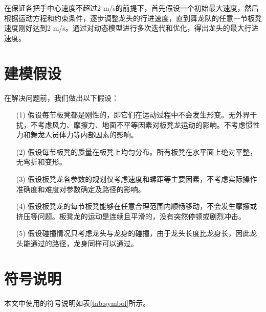 \documentclass[withoutpreface, bwprint]{cumcmthesis} %
\begin{document}
在保证各把手中心速度不超过2 m/s的前提下，首先假设一个初始最大速度，然后根据运动方程和约束条件，逐步调整龙头的行进速度，直到舞龙队的任意一节板凳速度刚好达到2 m/s。通过对动态模型进行多次迭代和优化，得出龙头的最大行进速度。

\section{建模假设}

在解决问题前，我们做出以下假设：

\begin{enumerate}
    \item[(1)] 假设每节板凳都是刚性的，即它们在运动过程中不会发生形变。无外界干扰，不考虑风力、摩擦力、地面不平等因素对板凳龙运动的影响。不考虑惯性力和舞龙人员体力等内部因素的影响。
    \item[(2)] 假设每节板凳的质量在板凳上均匀分布。所有板凳在水平面上绝对平整，无弯折和变形。
    \item[(3)] 假设板凳龙各参数的规划仅考虑速度和螺距等主要因素，不考虑实际操作准确度和难度对参数确定及路径的影响。
    \item[(4)] 假设板凳龙的每节板凳能够在任意合理范围内顺畅移动，不会发生摩擦或挤压等问题。板凳龙的运动是连续且平滑的，没有突然停顿或剧烈冲击。
    \item[(5)] 假设碰撞情况只考虑龙头与龙身的碰撞，由于龙头长度比龙身长，因此龙头能通过的路径，龙身同样可以通过。
\end{enumerate}

\section{符号说明}

本文中使用的符号说明如表\ref{tab:symbol}所示。

\begin{table}[!h]
    \caption{符号说明}
    \label{tab:symbol}
    \centering
\end{table}
\end{document}
